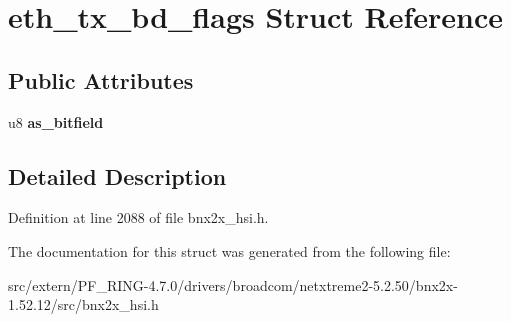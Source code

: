 \hypertarget{structeth__tx__bd__flags}{
\section{eth\_\-tx\_\-bd\_\-flags Struct Reference}
\label{structeth__tx__bd__flags}
}
\subsection*{Public Attributes}
\begin{DoxyCompactItemize}
\item 
\hypertarget{structeth__tx__bd__flags_a804f2fb4cbb3b82594034e76e74c86da}{
u8 {\bfseries as\_\-bitfield}}
\label{structeth__tx__bd__flags_a804f2fb4cbb3b82594034e76e74c86da}

\end{DoxyCompactItemize}


\subsection{Detailed Description}


Definition at line 2088 of file bnx2x\_\-hsi.h.



The documentation for this struct was generated from the following file:\begin{DoxyCompactItemize}
\item 
src/extern/PF\_\-RING-\/4.7.0/drivers/broadcom/netxtreme2-\/5.2.50/bnx2x-\/1.52.12/src/bnx2x\_\-hsi.h\end{DoxyCompactItemize}

